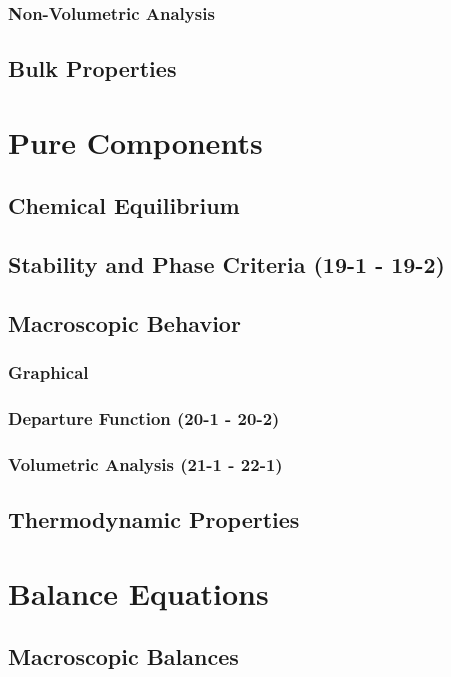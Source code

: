 \documentclass{mitqualif}
\begin{document}
\subsubsection{Non-Volumetric Analysis}





\subsection{Bulk Properties}
\section{Pure Components}
\subsection{Chemical Equilibrium}
\subsection{Stability and Phase Criteria (19-1 - 19-2)}


\subsection{Macroscopic Behavior}
\subsubsection{Graphical}
\subsubsection{Departure Function (20-1 - 20-2)}


\subsubsection{Volumetric Analysis (21-1 - 22-1)}


\subsection{Thermodynamic Properties}
\section{Balance Equations}
\subsection{Macroscopic Balances}
\end{document}
